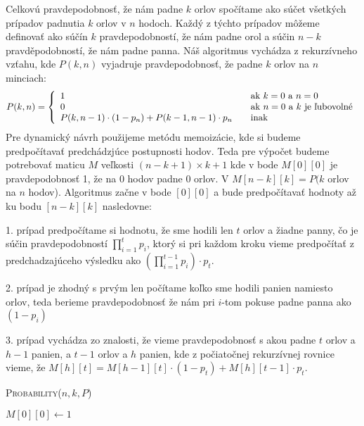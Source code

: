 \documentclass[12pt]{iv003}
\begin{document}
Celkovú pravdepodobnosť, že nám padne $k$ orlov spočítame ako súčet všetkých prípadov padnutia $k$ orlov v $n$ hodoch. Každý z týchto prípadov môžeme definovať ako súčín $k$
pravdepodobností, že nám padne orol a súčin $n-k$ pravděpodobností, že nám padne panna.
Náš algoritmus vychádza z rekurzívneho vzťahu, kde $P(k,n)$ vyjadruje pravdepodobnosť, že padne $k$ orlov na $n$ minciach:\\
\[ P(k,n) = \left\{
\begin{array}{l l}
	1 & \quad \text{ak $k = 0$ a $n = 0$}\\
	0 & \quad \text{ak $n = 0$ a $k$ je ľubovolné}\\
	P(k,n-1) \cdot (1 - p_{n})   + P(k-1,n-1) \cdot p_{n} & \quad \text{inak}\\
\end{array} \right.\]
Pre dynamický návrh použijeme metódu memoizácie, kde si budeme predpočítavať predchádzjúce postupnosti hodov. Teda pre výpočet budeme potrebovať maticu $M$ veľkosti $(n-k+1) \times k + 1$ kde v bode $M[0][0]$ je pravdepodobnosť 1, že na 0 hodov padne 0 orlov. V $M[n-k][k] = P(k$ orlov na $n$ hodov). Algoritmus začne v bode $[0][0]$ a bude predpočítavať hodnoty až ku bodu $[n-k][k]$ nasledovne:

1. prípad predpočítame si hodnotu, že sme hodili len $t$ orlov a žiadne panny, čo je
 súčin pravdepodobností $\prod\limits_{i=1}^{t} p_{i}$, ktorý si pri každom kroku vieme predpočítať z predchadzajúceho výsledku ako $(\prod\limits_{i=1}^{t -1} p_{i} )\cdot p_{t}$.
 
2. prípad je zhodný s prvým len počítame koľko sme hodili panien namiesto orlov, teda berieme pravdepodobnosť že nám pri $i$-tom pokuse padne panna ako $(1 - p_{i})$

3. prípad vychádza zo znalosti, že vieme pravdepodobnosť s akou padne $t$ orlov a $h - 1$ panien, a $t - 1$ orlov a $h$ panien, kde z počiatočnej rekurzívnej rovnice vieme, že $M[h][t] = M[h-1][t] \cdot (1 - p_{t}) + M[h][t-1] \cdot p_{t}$.\\

\begin{algorithm}[H]
	\caption{\textsc{Probability}($n, k, P$)}

	
	\BlankLine
	$M[0][0] \leftarrow 1$	



\end{algorithm}
\end{document}
